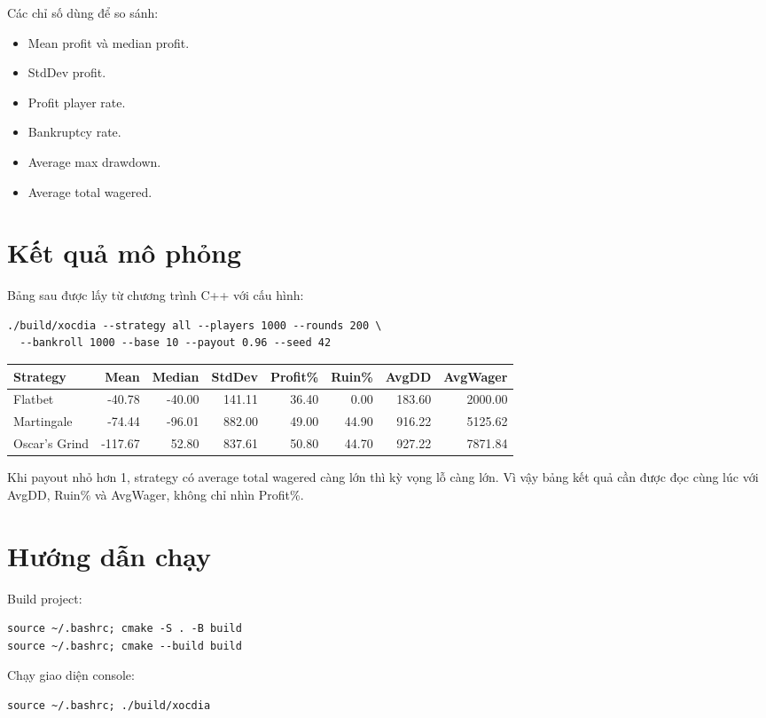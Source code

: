 \documentclass[12pt,a4paper]{article}
\begin{document}
Các chỉ số dùng để so sánh:
\begin{itemize}
  \item Mean profit và median profit.
  \item StdDev profit.
  \item Profit player rate.
  \item Bankruptcy rate.
  \item Average max drawdown.
  \item Average total wagered.
\end{itemize}

\section{Kết quả mô phỏng}
Bảng sau được lấy từ chương trình C++ với cấu hình:
\begin{lstlisting}
./build/xocdia --strategy all --players 1000 --rounds 200 \
  --bankroll 1000 --base 10 --payout 0.96 --seed 42
\end{lstlisting}

\begin{center}
\begin{longtable}{lrrrrrrr}
\toprule
Strategy & Mean & Median & StdDev & Profit\% & Ruin\% & AvgDD & AvgWager \\
\midrule
Flatbet & -40.78 & -40.00 & 141.11 & 36.40 & 0.00 & 183.60 & 2000.00 \\
Martingale & -74.44 & -96.01 & 882.00 & 49.00 & 44.90 & 916.22 & 5125.62 \\
Oscar's Grind & -117.67 & 52.80 & 837.61 & 50.80 & 44.70 & 927.22 & 7871.84 \\
\bottomrule
\end{longtable}
\end{center}

Khi payout nhỏ hơn 1, strategy có average total wagered càng lớn thì kỳ vọng lỗ càng lớn. Vì vậy bảng kết quả cần được đọc cùng lúc với AvgDD, Ruin\% và AvgWager, không chỉ nhìn Profit\%.

\section{Hướng dẫn chạy}
Build project:
\begin{lstlisting}
source ~/.bashrc; cmake -S . -B build
source ~/.bashrc; cmake --build build
\end{lstlisting}

Chạy giao diện console:
\begin{lstlisting}
source ~/.bashrc; ./build/xocdia
\end{lstlisting}
\end{document}
